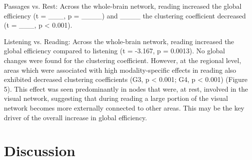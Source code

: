 Passages vs. Rest: Across the whole-brain network, reading increased the global efficiency (t = ___, p = ____) and ____ the clustering coefficient decreased (t = ___, p < 0.001).

Listening vs. Reading: Across the whole-brain network, reading increased the global efficiency compared to listening (t = -3.167, p = 0.0013). No global changes were found for the clustering coefficient. However, at the regional level, areas which were associated with high modality-specific effects in reading also exhibited decreased clustering coefficients (G3, p < 0.001; G4, p < 0.001) (Figure 5). This effect was seen predominantly in nodes that were, at rest, involved in the visual network, suggesting that during reading a large portion of the visual network becomes more externally connected to other areas. This may be the key driver of the overall increase in global efficiency.



\section{Discussion}